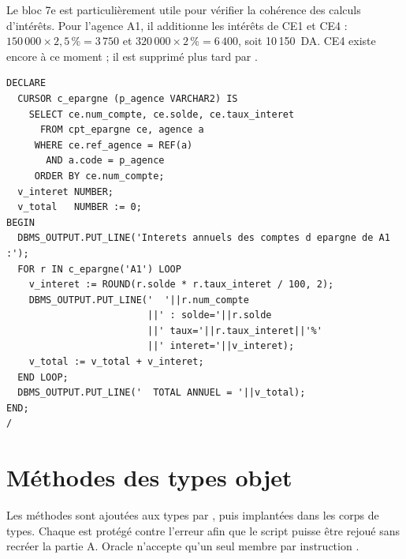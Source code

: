 Le bloc 7e est particulièrement utile pour vérifier la cohérence des calculs
d'intérêts. Pour l'agence A1, il additionne les intérêts de CE1 et CE4 :
$150\,000 \times 2,5\,\% = 3\,750$ et
$320\,000 \times 2\,\% = 6\,400$, soit 10\,150~DA. CE4 existe encore à ce
moment ; il est supprimé plus tard par .

\begin{lstlisting}[caption={Bloc 7e : total des intérêts annuels de l'agence A1.},label={lst:bloc-7e}]
DECLARE
  CURSOR c_epargne (p_agence VARCHAR2) IS
    SELECT ce.num_compte, ce.solde, ce.taux_interet
      FROM cpt_epargne ce, agence a
     WHERE ce.ref_agence = REF(a)
       AND a.code = p_agence
     ORDER BY ce.num_compte;
  v_interet NUMBER;
  v_total   NUMBER := 0;
BEGIN
  DBMS_OUTPUT.PUT_LINE('Interets annuels des comptes d epargne de A1 :');
  FOR r IN c_epargne('A1') LOOP
    v_interet := ROUND(r.solde * r.taux_interet / 100, 2);
    DBMS_OUTPUT.PUT_LINE('  '||r.num_compte
                         ||' : solde='||r.solde
                         ||' taux='||r.taux_interet||'%'
                         ||' interet='||v_interet);
    v_total := v_total + v_interet;
  END LOOP;
  DBMS_OUTPUT.PUT_LINE('  TOTAL ANNUEL = '||v_total);
END;
/
\end{lstlisting}

\section{Méthodes des types objet}

Les méthodes sont ajoutées aux types par ,
puis implantées dans les corps de types. Chaque  est protégé
contre l'erreur  afin que le script puisse être rejoué sans
recréer la partie A. Oracle n'accepte qu'un seul membre par instruction
.

